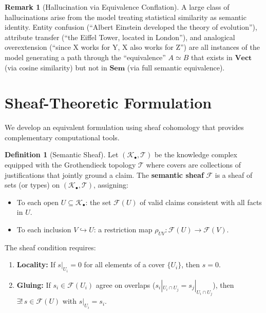 \documentclass[11pt,a4paper]{article}
\theoremstyle{plain}
\theoremstyle{definition}
\newtheorem{definition}[theorem]{Definition}
\newtheorem{remark}[theorem]{Remark}
\newcommand{\Sem}{\mathbf{Sem}}
\newcommand{\Vect}{\mathbf{Vect}}
\begin{document}
\begin{remark}[Hallucination via Equivalence Conflation]
A large class of hallucinations arise from the model treating statistical similarity as semantic identity. Entity confusion (``Albert Einstein developed the theory of evolution''), attribute transfer (``the Eiffel Tower, located in London''), and analogical overextension (``since X works for Y, X also works for Z'') are all instances of the model generating a path through the ``equivalence'' $A \simeq B$ that exists in $\Vect$ (via cosine similarity) but not in $\Sem$ (via full semantic equivalence).
\end{remark}

\section{Sheaf-Theoretic Formulation}\label{sec:sheaf}

We develop an equivalent formulation using sheaf cohomology that provides complementary computational tools.

\begin{definition}[Semantic Sheaf]\label{def:sheaf}
Let $(\mathcal{K}_\bullet, \mathcal{T})$ be the knowledge complex equipped with the Grothendieck topology $\mathcal{T}$ where covers are collections of justifications that jointly ground a claim. The \textbf{semantic sheaf} $\mathcal{F}$ is a sheaf of sets (or types) on $(\mathcal{K}_\bullet, \mathcal{T})$, assigning:
\begin{itemize}[nosep]
  \item To each open $U \subseteq \mathcal{K}_\bullet$: the set $\mathcal{F}(U)$ of valid claims consistent with all facts in $U$.
  \item To each inclusion $V \hookrightarrow U$: a restriction map $\rho_{UV}\colon \mathcal{F}(U) \to \mathcal{F}(V)$.
\end{itemize}
The sheaf condition requires:
\begin{enumerate}[nosep]
  \item \textbf{Locality:} If $s|_{U_i} = 0$ for all elements of a cover $\{U_i\}$, then $s = 0$.
  \item \textbf{Gluing:} If $s_i \in \mathcal{F}(U_i)$ agree on overlaps ($s_i|_{U_i \cap U_j} = s_j|_{U_i \cap U_j}$), then $\exists!\, s \in \mathcal{F}(U)$ with $s|_{U_i} = s_i$.
\end{enumerate}
\end{definition}
\end{document}
